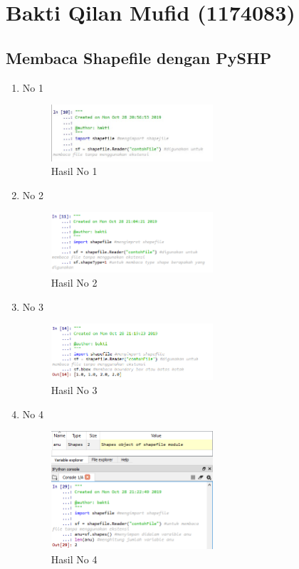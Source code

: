 \section{Bakti Qilan Mufid (1174083)}
\subsection{Membaca Shapefile dengan PySHP}
\begin{enumerate}
	\item No 1
	
	\begin{figure}[H]
		\includegraphics[width=6cm]{figures/Tugas3/1174083/pictureNo1.png}
		\centering
		\caption{Hasil No 1}
	\end{figure}
	
	\item No 2
	
	\begin{figure}[H]
		\includegraphics[width=6cm]{figures/Tugas3/1174083/pictureNo2.png}
		\centering
		\caption{Hasil No 2}
	\end{figure}
	
	\item No 3
	
	\begin{figure}[H]
		\includegraphics[width=6cm]{figures/Tugas3/1174083/pictureNo3.png}
		\centering
		\caption{Hasil No 3}
	\end{figure}
	
	\item No 4
	
	\begin{figure}[H]
		\includegraphics[width=6cm]{figures/Tugas3/1174083/pictureNo4.png}
		\centering
		\caption{Hasil No 4}
	\end{figure}
	

\end{enumerate}

